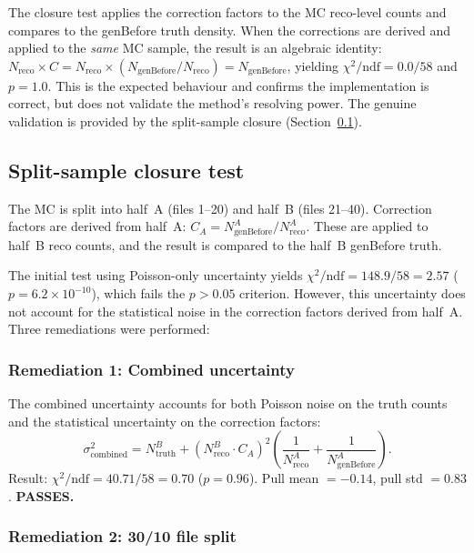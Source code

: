 \documentclass[11pt,a4paper]{article}
\begin{document}
The closure test applies the correction factors to the MC reco-level
counts and compares to the genBefore truth density.  When the
corrections are derived and applied to the \emph{same} MC sample,
the result is an algebraic identity:
$N_\text{reco} \times C = N_\text{reco} \times
(N_\text{genBefore}/N_\text{reco}) = N_\text{genBefore}$, yielding
$\chi^2/\text{ndf} = 0.0/58$ and $p = 1.0$.  This is the expected
behaviour and confirms the implementation is correct, but does not
validate the method's resolving power.  The genuine validation is
provided by the split-sample closure (Section~\ref{sec:split-closure}).

\subsection{Split-sample closure test}
\label{sec:split-closure}

The MC is split into half~A (files 1--20) and half~B (files 21--40).
Correction factors are derived from half~A: $C_A = N_\text{genBefore}^A
/ N_\text{reco}^A$.  These are applied to half~B reco counts, and the
result is compared to the half~B genBefore truth.

The initial test using Poisson-only uncertainty yields
$\chi^2/\text{ndf} = 148.9/58 = 2.57$ ($p = 6.2 \times 10^{-10}$),
which fails the $p > 0.05$ criterion.  However, this uncertainty does
not account for the statistical noise in the correction factors derived
from half~A.  Three remediations were performed:

\subsubsection{Remediation 1: Combined uncertainty}

The combined uncertainty accounts for both Poisson noise on the truth
counts and the statistical uncertainty on the correction factors:
\begin{equation}
  \sigma^2_\text{combined} = N_\text{truth}^B +
  \left(N_\text{reco}^B \cdot C_A\right)^2
  \left(\frac{1}{N_\text{reco}^A} + \frac{1}{N_\text{genBefore}^A}\right).
  \label{eq:combined-sigma}
\end{equation}
Result: $\chi^2/\text{ndf} = 40.71/58 = 0.70$ ($p = 0.96$).  Pull
mean $= -0.14$, pull std $= 0.83$.  \textbf{PASSES.}

\subsubsection{Remediation 2: 30/10 file split}
\end{document}
